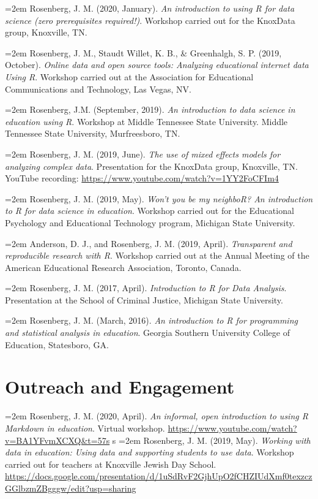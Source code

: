 \documentclass[
  11pt,
]{article}
\begin{document}
\hangindent=2em Rosenberg, J. M. (2020, January). \emph{An introduction
to using R for data science (zero prerequisites required!)}. Workshop
carried out for the KnoxData group, Knoxville, TN.

\hangindent=2em Rosenberg, J. M., Staudt Willet, K. B., \& Greenhalgh,
S. P. (2019, October). \emph{Online data and open source tools:
Analyzing educational internet data Using R}. Workshop carried out at
the Association for Educational Communications and Technology, Las
Vegas, NV.

\hangindent=2em Rosenberg, J.M. (September, 2019). \emph{An introduction
to data science in education using R}. Workshop at Middle Tennessee
State University. Middle Tennessee State University, Murfreesboro, TN.

\hangindent=2em Rosenberg, J. M. (2019, June). \emph{The use of mixed
effects models for analyzing complex data}. Presentation for the
KnoxData group, Knoxville, TN. YouTube recording:
\url{https://www.youtube.com/watch?v=1YY2FoCFIm4}

\hangindent=2em Rosenberg, J. M. (2019, May). \emph{Won't you be my
neighboR? An introduction to R for data science in education}. Workshop
carried out for the Educational Psychology and Educational Technology
program, Michigan State University.

\hangindent=2em Anderson, D. J., and Rosenberg, J. M. (2019, April).
\emph{Transparent and reproducible research with R}. Workshop carried
out at the Annual Meeting of the American Educational Research
Association, Toronto, Canada.

\hangindent=2em Rosenberg, J. M. (2017, April). \emph{Introduction to R
for Data Analysis}. Presentation at the School of Criminal Justice,
Michigan State University.

\hangindent=2em Rosenberg, J. M. (March, 2016). \emph{An introduction to
R for programming and statistical analysis in education}. Georgia
Southern University College of Education, Statesboro, GA.

\hypertarget{outreach-and-engagement}{%
\section{Outreach and Engagement}\label{outreach-and-engagement}}

\hangindent=2em Rosenberg, J. M. (2020, April). \emph{An informal, open
introduction to using R Markdown in education}. Virtual workshop.
\url{https://www.youtube.com/watch?v=BA1YFvmXCXQ\&t=57s} s
\hangindent=2em Rosenberg, J. M. (2019, May). \emph{Working with data in
education: Using data and supporting students to use data}. Workshop
carried out for teachers at Knoxville Jewish Day School.
\url{https://docs.google.com/presentation/d/1uSdRvF2GjhUpO2fCHZIUdXmf0texzczGGlbzmZBgggw/edit?usp=sharing}
\end{document}
